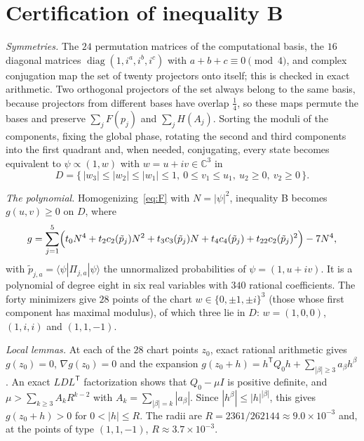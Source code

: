 \documentclass[11pt,a4paper]{article}
\theoremstyle{plain}
\DeclareMathOperator{\diag}{diag}
\newcommand{\C}{\mathbb C}
\begin{document}
\section{Certification of inequality B}\label{sec:B}

\emph{Symmetries.} The $24$ permutation matrices of the computational basis,
the $16$ diagonal matrices $\diag(1,i^a,i^b,i^c)$ with $a+b+c\equiv0\pmod4$,
and complex conjugation map the set of twenty projectors onto itself; this is
checked in exact arithmetic. Two orthogonal projectors of the set always belong
to the same basis, because projectors from different bases have overlap
$\tfrac14$, so these maps permute the bases and preserve $\sum_jF(p_j)$ and
$\sum_jH(A_j)$. Sorting the moduli of the components, fixing the global phase,
rotating the second and third components into the first quadrant and, when
needed, conjugating, every state becomes equivalent to $\psi\propto(1,w)$ with
$w=u+iv\in\C^3$ in
\begin{equation}
  D=\{\,|w_3|\le|w_2|\le|w_1|\le1,\ 0\le v_1\le u_1,\ u_2\ge0,\ v_2\ge0\,\}.
\end{equation}

\emph{The polynomial.} Homogenizing~\eqref{eq:F} with $N=|\psi|^2$, inequality
B becomes $g(u,v)\ge0$ on $D$, where
\begin{equation}
  g=\sum_{j=1}^5\Bigl(t_0N^4+t_2c_2(\tilde p_j)N^2+t_3c_3(\tilde p_j)N
  +t_4c_4(\tilde p_j)+t_{22}c_2(\tilde p_j)^2\Bigr)-7N^4,
\end{equation}
with $\tilde p_{j,a}=\langle\psi|\Pi_{j,a}|\psi\rangle$ the unnormalized
probabilities of $\psi=(1,u+iv)$. It is a polynomial of degree eight in six
real variables with $340$ rational coefficients. The forty minimizers give
$28$ points of the chart $w\in\{0,\pm1,\pm i\}^3$ (those whose first component
has maximal modulus), of which three lie in $D$: $w=(1,0,0)$, $(1,i,i)$ and
$(1,1,-1)$.

\emph{Local lemmas.} At each of the $28$ chart points $z_0$, exact rational
arithmetic gives $g(z_0)=0$, $\nabla g(z_0)=0$ and the expansion
$g(z_0+h)=h^{\mathsf T}Q_0h+\sum_{|\beta|\ge3}a_\beta h^\beta$. An exact
$LDL^{\mathsf T}$ factorization shows that $Q_0-\mu I$ is positive definite, and
$\mu>\sum_{k\ge3}A_kR^{k-2}$ with $A_k=\sum_{|\beta|=k}|a_\beta|$. Since
$|h^\beta|\le|h|^{|\beta|}$, this gives $g(z_0+h)>0$ for $0<|h|\le R$. The radii
are $R=2361/262144\approx9.0\times10^{-3}$ and, at the points of type
$(1,1,-1)$, $R\approx3.7\times10^{-3}$.
\end{document}
